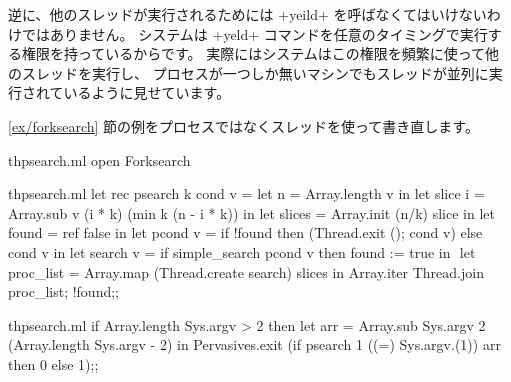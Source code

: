 逆に、他のスレッドが実行されるためには \ml+yeild+ を呼ばなくてはいけないわけではありません。
システムは \ml+yeld+ コマンドを任意のタイミングで実行する権限を持っているからです。
実際にはシステムはこの権限を頻繁に使って他のスレッドを実行し、
プロセスが一つしか無いマシンでもスレッドが並列に実行されているように見せています。

\begin{example}
\ref{ex/forksearch} 節の例をプロセスではなくスレッドを使って書き直します。
\begin{codefile}{thpsearch.ml}
open Forksearch
\end{codefile}
%
\begin{listingcodefile}[style=numbers]{thpsearch.ml}
let rec psearch k cond v =
  let n = Array.length v in
  let slice i = Array.sub v (i * k) (min k (n - i * k)) in
  let slices = Array.init (n/k) slice in
  let found = ref false in
  let pcond v = if !found then (Thread.exit (); cond v) else cond v in
  let search v = if simple_search pcond v then found := true in $\label{prog:search}$
  let proc_list = Array.map (Thread.create search) slices in
  Array.iter Thread.join proc_list;
  !found;;
\end{listingcodefile}
%
\begin{codefile}{thpsearch.ml}
if Array.length Sys.argv > 2 then
let arr = Array.sub Sys.argv 2 (Array.length Sys.argv - 2) in
Pervasives.exit (if psearch 1 ((=) Sys.argv.(1)) arr then  0 else 1);;
\end{codefile}
%

\end{example}
